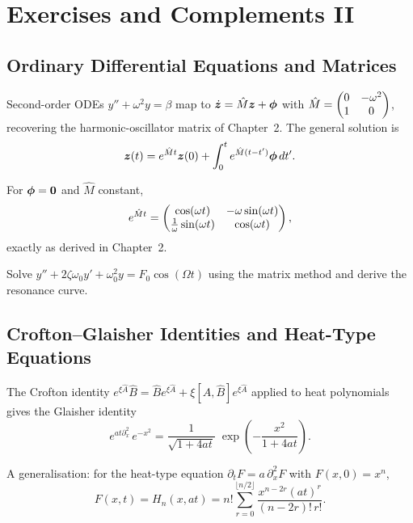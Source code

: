 \chapter{Exercises and Complements II}

\section{Ordinary Differential Equations and Matrices}

Second-order ODEs $y''+\omega^2 y=\beta$ map to $\dot{\bm{z}}=\hat M\bm{z}+\bm{\phi}$ with
$\hat M=\begin{pmatrix}0&-\omega^2\\1&0\end{pmatrix}$, recovering the harmonic-oscillator matrix of
Chapter~2. The general solution is
\begin{equation}
\bm{z}(t) = e^{\hat M t}\bm{z}(0) + \int_0^t e^{\hat M(t-t')}\bm{\phi}\,dt'.
\label{eq:6.1.1}
\end{equation}

For $\bm{\phi}=\bm{0}$ and $\hat M$ constant,
\begin{equation}
e^{\hat M t} =
\begin{pmatrix}\cos(\omega t)&-\omega\sin(\omega t)\\
     \frac{1}{\omega}\sin(\omega t)&\cos(\omega t)\end{pmatrix},
\label{eq:6.1.2}
\end{equation}
exactly as derived in Chapter~2.

\begin{exercise}
Solve $y''+2\zeta\omega_0 y'+\omega_0^2 y = F_0\cos(\Omega t)$ using the matrix
method and derive the resonance curve.
\end{exercise}

\section{Crofton--Glaisher Identities and Heat-Type Equations}

The Crofton identity
$e^{\xi\hat A}\hat B = \hat B e^{\xi\hat A} + \xi[\hat A,\hat B]e^{\xi\hat A}$
applied to heat polynomials gives the Glaisher identity
\begin{equation}
e^{at\partial_x^2}\,e^{-x^2}
= \frac{1}{\sqrt{1+4at}}\;
\exp\!\left(-\frac{x^2}{1+4at}\right).
\label{eq:6.2.1}
\end{equation}

A generalisation: for the heat-type equation
$\partial_t F = a\,\partial_x^2 F$ with $F(x,0)=x^n$,
\begin{equation}
F(x,t) = H_n(x,at) = n!\sum_{r=0}^{\lfloor n/2\rfloor}
\frac{x^{n-2r}(at)^r}{(n-2r)!\,r!}.
\label{eq:6.2.2}
\end{equation}

